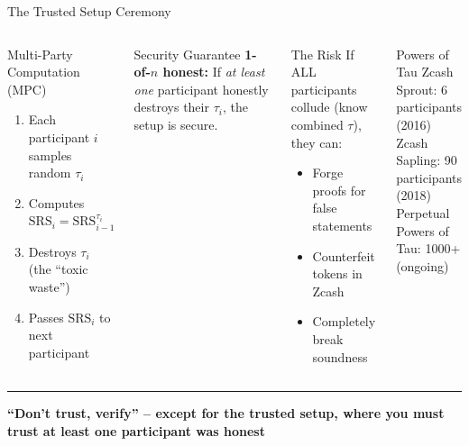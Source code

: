 \documentclass[8pt,aspectratio=169]{beamer}
\newcommand{\bottomnote}[1]{\vfill\vspace{-2mm}\textcolor{mllavender2}{\rule{\textwidth}{0.4pt}}\vspace{1mm}\footnotesize\textbf{#1}}
\begin{document}
\begin{frame}{The Trusted Setup Ceremony}
\begin{columns}[T]
\begin{block}{Multi-Party Computation (MPC)}
\footnotesize
\begin{enumerate}
  \item Each participant $i$ samples random $\tau_i$
  \item Computes $\text{SRS}_i = \text{SRS}_{i-1}^{\tau_i}$
  \item Destroys $\tau_i$ (the ``toxic waste'')
  \item Passes $\text{SRS}_i$ to next participant
\end{enumerate}
\end{block}
\vspace{2mm}

\begin{block}{Security Guarantee}
\footnotesize
\textbf{1-of-$n$ honest:} If \textit{at least one} participant honestly destroys their $\tau_i$, the setup is secure.
\end{block}
\vspace{2mm}
\begin{alertblock}{\footnotesize The Risk}
\footnotesize
If ALL participants collude (know combined $\tau$), they can:
\begin{itemize}
  \item Forge proofs for false statements
  \item Counterfeit tokens in Zcash
  \item Completely break soundness
\end{itemize}
\end{alertblock}
\vspace{2mm}
\begin{exampleblock}{\footnotesize Powers of Tau}
\footnotesize
Zcash Sprout: 6 participants (2016)\\
Zcash Sapling: 90 participants (2018)\\
Perpetual Powers of Tau: 1000+ (ongoing)
\end{exampleblock}
\end{columns}
\bottomnote{``Don't trust, verify'' -- except for the trusted setup, where you must trust at least one participant was honest}
\end{frame}
\end{document}
